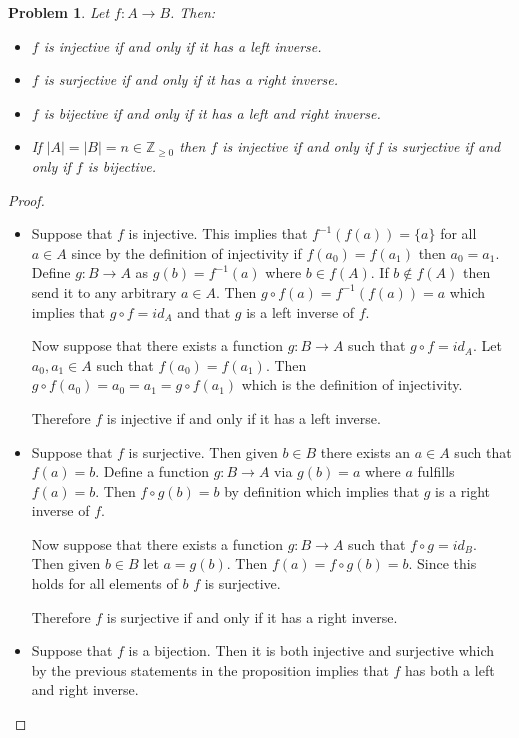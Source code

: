 \documentclass[10pt]{article}
\newcommand{\bb}[1]{\mathbb{#1}}
\newcommand{\ra}{\rightarrow}
\theoremstyle{plain}
\newtheorem{problem}{Problem}
\theoremstyle{remark}
\begin{document}
\begin{problem}
  Let $f:A\ra B$. Then:
  \begin{itemize}
  \item[a)] $f$ is injective if and only if it has a left inverse.
  \item[b)] $f$ is surjective if and only if it has a right inverse.
  \item[c)] $f$ is bijective if and only if it has a left and right inverse.
  \item[d)] If $|A|=|B|=n\in \bb{Z}_{\geq0}$ then $f$ is injective if and only if f is
    surjective if and only if $f$ is bijective.
  \end{itemize}
\end{problem}

\begin{proof}\ \\
  \begin{itemize}
  \item[a)] Suppose that $f$ is injective. This implies that $f^{-1}(f(a))=\{a\}$ for all
    $a\in A$ since by the definition of injectivity if $f(a_0)=f(a_1)$ then $a_0=a_1$.
    Define $g:B\ra A$ as $g(b)=f^{-1}(a)$ where $b\in f(A)$. If $b\notin f(A)$
    then send it to any arbitrary $a\in A$. Then $g\circ f(a)=f^{-1}(f(a))=a$ which implies
    that $g\circ f=id_A$ and that $g$ is a left inverse of $f$.

    Now suppose that there exists a function $g:B\ra A$ such that $g\circ f = id_A$.
    Let $a_0,a_1\in A$ such that $f(a_0)=f(a_1)$. Then
    $g\circ f(a_0)=a_0=a_1=g\circ f(a_1)$ which is the definition of injectivity.

    Therefore $f$ is injective if and only if it has a left inverse.
  \item[b)] Suppose that $f$ is surjective. Then given $b\in B$ there exists an $a\in A$
    such that $f(a)=b$. Define a function $g:B\ra A$ via $g(b)=a$ where $a$ fulfills
    $f(a)=b$. Then $f\circ g(b)=b$ by definition which implies that $g$ is a right
    inverse of $f$.

    Now suppose that there exists a function $g:B\ra A$ such that $f\circ g= id_B$. Then
    given $b\in B$ let $a=g(b)$. Then $f(a)=f\circ g(b)=b$. Since this holds for all
    elements of $b$ $f$ is surjective.

    Therefore $f$ is surjective if and only if it has a right inverse.
  \item[c)] Suppose that $f$ is a bijection. Then it is both injective and surjective
    which by the previous statements in the proposition implies that $f$ has both
    a left and right inverse.


\end{itemize}
\end{proof}
\end{document}
